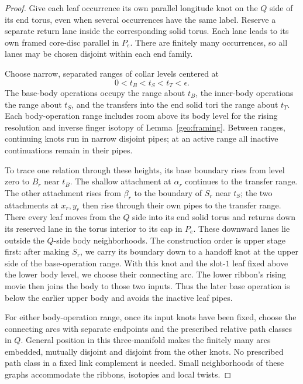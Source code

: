 \begin{proof}
Give each leaf occurrence its own parallel longitude knot on the
$Q$ side of its end torus, even when several occurrences have the
same label.  Reserve a separate return lane inside the corresponding
solid torus.  Each lane leads to its own framed core-disc parallel
in $P_e$.  There are finitely many occurrences, so all lanes may be
chosen disjoint within each end family.

Choose narrow, separated ranges of collar levels centered at
\[
                    0<t_B<t_S<t_T<\epsilon.
\]
The base-body operations occupy the range about $t_B$, the inner-body
operations the range about $t_S$, and the transfers into the end solid
tori the range about $t_T$.  Each body-operation range includes room
above its body level for the rising resolution and inverse finger isotopy of
Lemma~\ref{geo:framing}.  Between ranges, continuing knots run in narrow
disjoint pipes; at an active range all inactive continuations remain in
their pipes.

To trace one relation through these heights, its base boundary rises
from level zero to $B_r$ near $t_B$.  The shallow attachment at
$\alpha_r$ continues to the transfer range.  The other attachment rises
from $\beta_r$ to the boundary of $S_r$ near $t_S$; the two attachments
at $x_r,y_r$ then rise through their own pipes to the transfer range.
There every leaf moves from the $Q$ side into its end solid torus and
returns down its reserved lane in the torus interior to its cap in $P_e$.
These downward lanes lie outside the $Q$-side body neighborhoods.
The construction order is upper stage first: after making $S_r$, we
carry its boundary down to a handoff knot at the upper side of the
base-operation range.  With this knot and the slot-$1$ leaf fixed above
the lower body level, we choose their connecting arc.  The lower
ribbon's rising movie then joins the body to those two inputs.  Thus the
later base operation is below the earlier upper body and avoids the
inactive leaf pipes.

For either body-operation range, once its input knots have been fixed,
choose the connecting arcs with separate endpoints and the prescribed relative
path classes in $Q$.  General position in this three-manifold makes
the finitely many arcs embedded, mutually disjoint and disjoint from
the other knots.  No prescribed path class in a fixed link complement
is needed.  Small neighborhoods of these graphs accommodate the
ribbons, isotopies and local twists.


\end{proof}
